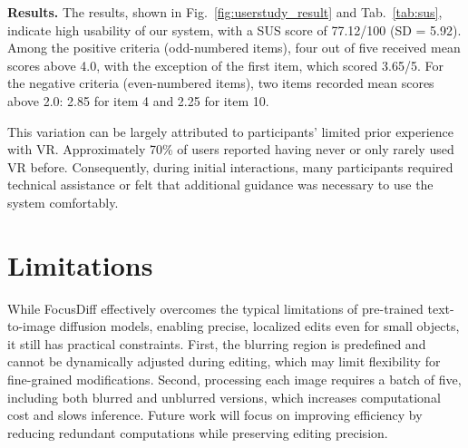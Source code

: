 \documentclass[runningheads]{llncs}
\begin{document}


\textbf{Results. }
The results, shown in Fig.~\ref{fig:userstudy_result} and Tab.~\ref{tab:sus}, indicate high usability of our system, with a SUS score of 77.12/100 (SD = 5.92). Among the positive criteria (odd-numbered items), four out of five received mean scores above 4.0, with the exception of the first item, which scored 3.65/5. For the negative criteria (even-numbered items), two items recorded mean scores above 2.0: 2.85 for item 4 and 2.25 for item 10.

This variation can be largely attributed to participants’ limited prior experience with VR. Approximately 70\% of users reported having never or only rarely used VR before. Consequently, during initial interactions, many participants required technical assistance or felt that additional guidance was necessary to use the system comfortably.

\section{Limitations}
While FocusDiff effectively overcomes the typical limitations of pre-trained text-to-image diffusion models, enabling precise, localized edits even for small objects, it still has practical constraints. First, the blurring region is predefined and cannot be dynamically adjusted during editing, which may limit flexibility for fine-grained modifications. Second, processing each image requires a batch of five, including both blurred and unblurred versions, which increases computational cost and slows inference. Future work will focus on improving efficiency by reducing redundant computations while preserving editing precision.
\end{document}
